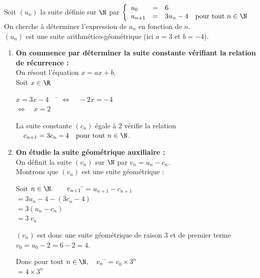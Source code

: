 \documentclass[a4paper,11pt,cours]{nsi} %
\begin{document}
\begin{methode}
    Soit $(u_n)$ la suite définie sur $\N$ par $\left\{
		\begin{array}{llll}
			u_0 & = & 6 & \\
			u_{n+1} & = & 3 u_n-4 & \text{pour tout } n\in\N\\
		\end{array}
    \right. $\\
    On cherche à déterminer l'expression de $u_n$ en fonction de $n$.\\[.5em]
    $(u_n)$ est une suite arithmético-géométrique (ici $a=3$ et $b=-4$).
    \begin{enumerate}[label=\textbullet]
        \item 
        \textbf{On commence par déterminer la suite constante vérifiant la relation de récurrence :}\\ 
        On résout l'équation $x=ax+b$.\\
        Soit $x\in\R$
        \begin{tabbing}
            $x=3x-4 \quad$ \= $\iff \quad -2x=-4$\\
                \> $\iff \quad x=2$
        \end{tabbing}
        La suite constante $(c_n)$ égale à $2$ vérifie la relation $\quad c_{n+1} = 3 c_n-4 \quad  \text{pour tout } n\in\N$.

        \item \textbf{On étudie la suite géométrique auxiliaire :}\\
        On définit la suite $(v_n)$ sur $\N$ par $v_n= u_n-c_n$.\\[.5em]
        Montrons que $(v_n)$ est une suite géométrique :
        \begin{tabbing}
            Soit $n\in\N. \qquad v_{n+1}$ \=$=u_{n+1}-c_{n+1}$\\
            \>  $=3u_n-4-\left(3c_n-4\right)$\\
            \>  $=3\left(u_n-c_n\right)$\\
            \>  $=3\ v_n$
        \end{tabbing}
        
        $(v_n)$ est donc une suite géométrique de raison $3$ et de premier terme $v_0= u_0-2=6-2=4$.
        \begin{tabbing}
            Donc pour tout $n\in\N, \quad v_n$  \=$=v_0\times 3^n$\\
                \>  $=4\times 3^n$
        \end{tabbing}
        

\end{enumerate}
\end{methode}
\end{document}
